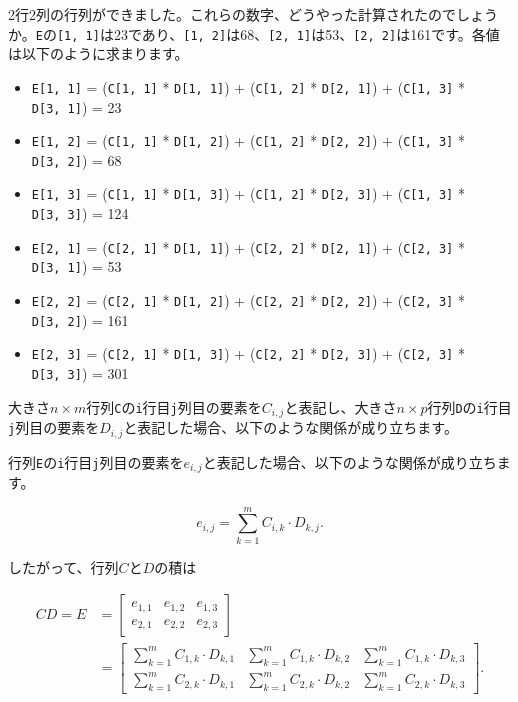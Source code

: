 \documentclass[
  a4paper,
  pandoc,
  ja=standard,
  jafont=haranoaji]{bxjsbook}
\providecommand{\tightlist}{%
  \setlength{\itemsep}{0pt}\setlength{\parskip}{0pt}}
\begin{document}
2行2列の行列ができました。これらの数字、どうやった計算されたのでしょうか。\texttt{E}の\texttt{{[}1,\ 1{]}}は23であり、\texttt{{[}1,\ 2{]}}は68、\texttt{{[}2,\ 1{]}}は53、\texttt{{[}2,\ 2{]}}は161です。各値は以下のように求まります。

\begin{itemize}
\tightlist
\item
  \texttt{E{[}1,\ 1{]}} = (\texttt{C{[}1,\ 1{]}} *
  \texttt{D{[}1,\ 1{]}}) + (\texttt{C{[}1,\ 2{]}} *
  \texttt{D{[}2,\ 1{]}}) + (\texttt{C{[}1,\ 3{]}} *
  \texttt{D{[}3,\ 1{]}}) = 23
\item
  \texttt{E{[}1,\ 2{]}} = (\texttt{C{[}1,\ 1{]}} *
  \texttt{D{[}1,\ 2{]}}) + (\texttt{C{[}1,\ 2{]}} *
  \texttt{D{[}2,\ 2{]}}) + (\texttt{C{[}1,\ 3{]}} *
  \texttt{D{[}3,\ 2{]}}) = 68
\item
  \texttt{E{[}1,\ 3{]}} = (\texttt{C{[}1,\ 1{]}} *
  \texttt{D{[}1,\ 3{]}}) + (\texttt{C{[}1,\ 2{]}} *
  \texttt{D{[}2,\ 3{]}}) + (\texttt{C{[}1,\ 3{]}} *
  \texttt{D{[}3,\ 3{]}}) = 124
\item
  \texttt{E{[}2,\ 1{]}} = (\texttt{C{[}2,\ 1{]}} *
  \texttt{D{[}1,\ 1{]}}) + (\texttt{C{[}2,\ 2{]}} *
  \texttt{D{[}2,\ 1{]}}) + (\texttt{C{[}2,\ 3{]}} *
  \texttt{D{[}3,\ 1{]}}) = 53
\item
  \texttt{E{[}2,\ 2{]}} = (\texttt{C{[}2,\ 1{]}} *
  \texttt{D{[}1,\ 2{]}}) + (\texttt{C{[}2,\ 2{]}} *
  \texttt{D{[}2,\ 2{]}}) + (\texttt{C{[}2,\ 3{]}} *
  \texttt{D{[}3,\ 2{]}}) = 161
\item
  \texttt{E{[}2,\ 3{]}} = (\texttt{C{[}2,\ 1{]}} *
  \texttt{D{[}1,\ 3{]}}) + (\texttt{C{[}2,\ 2{]}} *
  \texttt{D{[}2,\ 3{]}}) + (\texttt{C{[}2,\ 3{]}} *
  \texttt{D{[}3,\ 3{]}}) = 301
\end{itemize}

大きさ\(n \times m\)行列\texttt{C}の\texttt{i}行目\texttt{j}列目の要素を\(C_{i,j}\)と表記し、大きさ\(n \times p\)行列\texttt{D}の\texttt{i}行目\texttt{j}列目の要素を\(D_{i,j}\)と表記した場合、以下のような関係が成り立ちます。

行列\texttt{E}の\texttt{i}行目\texttt{j}列目の要素を\(e_{i,j}\)と表記した場合、以下のような関係が成り立ちます。

\[
e_{i, j} = \sum_{k = 1}^m C_{i, k} \cdot D_{k, j}.
\]

したがって、行列\(C\)と\(D\)の積は

\begin{align} 
CD = E & = \left[
\begin{matrix} 
e_{1, 1} & e_{1, 2} & e_{1, 3} \\ 
e_{2, 1} & e_{2, 2} & e_{2, 3}
\end{matrix}
\right] \\
& = \left[
\begin{matrix} 
\sum_{k = 1}^m C_{1, k} \cdot D_{k, 1} & \sum_{k = 1}^m C_{1, k} \cdot D_{k, 2} & \sum_{k = 1}^m C_{1, k} \cdot D_{k, 3} \\ 
\sum_{k = 1}^m C_{2, k} \cdot D_{k, 1} & \sum_{k = 1}^m C_{2, k} \cdot D_{k, 2} & \sum_{k = 1}^m C_{2, k} \cdot D_{k, 3}
\end{matrix}
\right].
\end{align}
\end{document}

